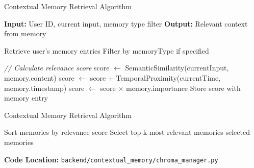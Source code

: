 \documentclass[11pt]{beamer}
\begin{document}
\begin{frame}[fragile]{Contextual Memory Retrieval Algorithm}
    \vspace{-0.25cm}
    {\scriptsize
    \begin{algorithm}[H]
    \caption{Contextual Memory Retrieval Algorithm}
    \begin{algorithmic}[1]
        \State \textbf{Input:} User ID, current input, memory type filter
        \State \textbf{Output:} Relevant context from memory
        
        \State Retrieve user's memory entries
        \State Filter by memoryType if specified
        
            \State \textit{// Calculate relevance score}
            \State score $\gets$ SemanticSimilarity(currentInput, memory.content)
            \State score $\gets$ score + TemporalProximity(currentTime, memory.timestamp)
            \State score $\gets$ score $\times$ memory.importance
            \State Store score with memory entry
        \EndFor
    \EndProcedure
    \end{algorithmic}
    \end{algorithm}
    }
\end{frame}

\begin{frame}[fragile]{Contextual Memory Retrieval Algorithm}
    \vspace{-0.25cm}
    {\scriptsize
    \begin{algorithm}[H]
    \caption{Contextual Memory Retrieval Algorithm (Continuation)}
    \begin{algorithmic}[1]
        \State Sort memories by relevance score
        \State Select top-k most relevant memories
        \State \Return selected memories
    \EndProcedure
    \end{algorithmic}
    \end{algorithm}
    }
    \vspace{0.05cm}
    \centering
    {\scriptsize \textbf{Code Location:} \texttt{backend/contextual\_memory/chroma\_manager.py}}
\end{frame}
\end{document}
